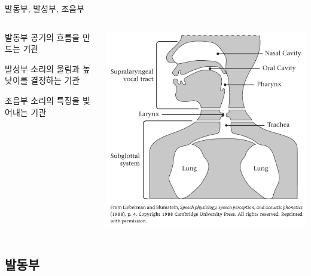 \documentclass[11pt, aspectratio=169]{beamer}
\begin{document}
\begin{frame}[t]{발동부, 발성부, 조음부}
    \begin{columns}
        \begin{column}[T]{0.43\textwidth}
            \begin{block}{발동부}
                공기의 흐름을 만드는 기관
            \end{block}
            \begin{block}{발성부}
                소리의 울림과 높낮이를 결정하는 기관
            \end{block}
            \begin{block}{조음부}
                소리의 특징을 빚어내는 기관
            \end{block}
        \end{column}
        \begin{column}[T]{0.5\textwidth}
            \includegraphics[height=0.8\textheight]{img/speech_production_mechanism.png}
        \end{column}
    \end{columns}
\end{frame}

\subsection{발동부}
\end{document}
